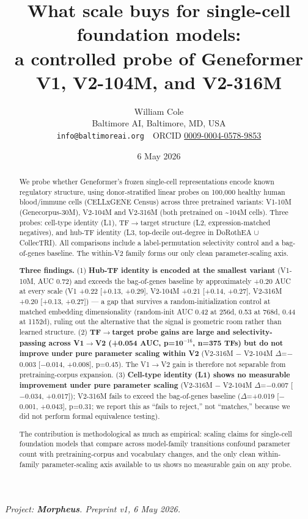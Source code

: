 \documentclass[
  11pt,
]{article}
\title{What scale buys for single-cell foundation models: \\[2pt]
\large a controlled probe of Geneformer V1, V2-104M, and V2-316M}
\author{William Cole \\[2pt]
{\small Baltimore AI, Baltimore, MD, USA} \\
{\small\texttt{info@baltimoreai.org} \,\textbar\, ORCID \href{https://orcid.org/0009-0004-0578-9853}{0009-0004-0578-9853}}}
\date{6 May 2026}
\begin{document}
\maketitle

\begin{center}\small\itshape Project: \textbf{Morpheus}. Preprint v1, 6 May 2026.\end{center}
\begin{abstract}
\noindent We probe whether Geneformer's frozen single-cell representations encode
known regulatory structure, using donor-stratified linear probes on
100,000 healthy human blood/immune cells (CELLxGENE Census) across three
pretrained variants: V1-10M (Genecorpus-30M), V2-104M and V2-316M (both
pretrained on \textasciitilde104M cells). Three probes: cell-type
identity (L1), TF$\to$target structure (L2, expression-matched negatives),
and hub-TF identity (L3, top-decile out-degree in DoRothEA $\cup$ CollecTRI).
All comparisons include a label-permutation selectivity control \citep{hewitt2019} and a bag-of-genes baseline. The within-V2 family forms
our only clean parameter-scaling axis.

\textbf{Three findings.} (1) \textbf{Hub-TF identity is encoded at the
smallest variant} (V1-10M, AUC 0.72) and exceeds the bag-of-genes
baseline by approximately +0.20 AUC at every scale (V1 +0.22 {[}+0.13, +0.29{]}, V2-104M +0.21 {[}+0.14, +0.27{]}, V2-316M +0.20 {[}+0.13, +0.27{]}) --- a gap that survives a random-initialization control at
matched embedding dimensionality (random-init AUC 0.42 at 256d, 0.53 at 768d, 0.44 at 1152d), ruling out the alternative that the signal is
geometric room rather than learned structure. (2) \textbf{TF$\to$target
probe gains are large and selectivity-passing across V1$\to$V2 (+0.054 AUC,
p=10$^{-16}$, n=375 TFs) but do not improve under pure parameter scaling
within V2} (V2-316M $-$ V2-104M $\Delta$=$-$0.003 {[}$-$0.014, +0.008{]}, p=0.45).
The V1$\to$V2 gain is therefore not separable from pretraining-corpus
expansion. (3) \textbf{Cell-type identity (L1) shows no measurable
improvement under pure parameter scaling} (V2-316M $-$ V2-104M $\Delta$=$-$0.007
{[}$-$0.034, +0.017{]}); V2-316M fails to exceed the bag-of-genes baseline
($\Delta$=+0.019 {[}$-$0.001, +0.043{]}, p=0.31; we report this as ``fails to
reject,'' not ``matches,'' because we did not perform formal equivalence
testing).

The contribution is methodological as much as empirical: scaling claims
for single-cell foundation models that compare across model-family
transitions confound parameter count with pretraining-corpus and
vocabulary changes, and the only clean within-family parameter-scaling
axis available to us shows no measurable gain on any probe.

\end{abstract}
\end{document}
